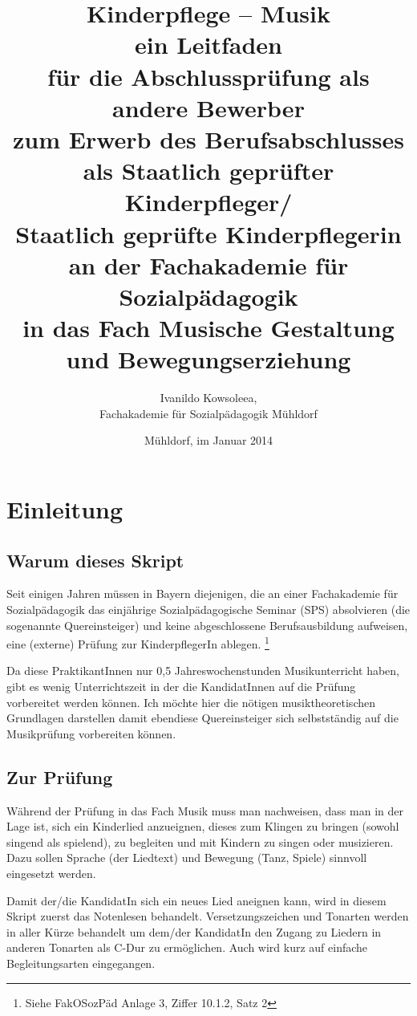 \documentclass[10pt,a4paper,twoside]{report}
\title{{\Huge Kinderpflege -- Musik}\\ \vspace{4mm}
    \small{ein Leitfaden\\
    für die Abschlussprüfung als andere Bewerber\\ 
    zum Erwerb des Berufsabschlusses\\ 
    als Staatlich geprüfter Kinderpfleger/\\ 
    Staatlich geprüfte Kinderpflegerin\\
    an der Fachakademie für Sozialpädagogik\\
    in das Fach Musische Gestaltung und Bewegungserziehung}
}
\author{Ivanildo Kowsoleea,\\Fachakademie für Sozialpädagogik Mühldorf}
\date{Mühldorf, im Januar 2014}
\begin{document}
\maketitle
\tableofcontents

\parskip 4pt
\leading{13.0pt}
\chapter{Einleitung}
\section{Warum dieses Skript}
Seit einigen Jahren müssen in Bayern diejenigen, die an einer Fachakademie für 
Sozialpädagogik das 
einjährige Sozialpädagogische Seminar (SPS) absolvieren 
(die sogenannte Quereinsteiger) und keine abgeschlossene Berufsausbildung
aufweisen, eine (externe) Prüfung zur KinderpflegerIn ablegen.%
\footnote{Siehe FakOSozPäd Anlage 3, Ziffer 10.1.2, Satz 2}


Da diese PraktikantInnen nur 0,5 Jahreswochenstunden Musikunterricht haben,
gibt es wenig Unterrichtszeit in der die KandidatInnen auf die
Prüfung vorbereitet werden können. Ich möchte hier die
nötigen musiktheoretischen Grundlagen darstellen
damit ebendiese Quereinsteiger 
sich selbstständig 
auf die Musikprüfung vorbereiten können.

\section{Zur Prüfung}
Während der Prüfung in das Fach Musik muss man nachweisen, 
dass man in der Lage ist,
sich ein Kinderlied anzueignen, 
dieses zum Klingen zu bringen (sowohl singend als spielend), 
zu begleiten und mit 
Kindern zu singen oder musizieren. Dazu sollen
Sprache (der Liedtext) und Bewegung (Tanz, Spiele) sinnvoll eingesetzt werden.

Damit der/die KandidatIn sich ein neues Lied aneignen kann, 
wird in diesem Skript zuerst das 
Notenlesen behandelt. Versetzungszeichen und Tonarten werden in aller Kürze 
behandelt um dem/der KandidatIn den Zugang zu Liedern in anderen Tonarten
als C-Dur zu ermöglichen. Auch wird kurz auf 
einfache Begleitungsarten eingegangen. 
\end{document}
